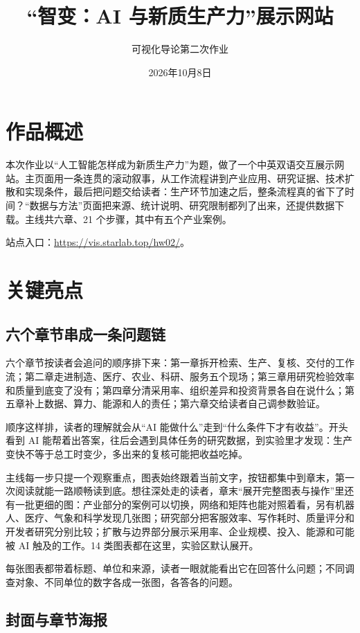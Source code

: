 \documentclass[UTF8,a4paper,11pt,fontset=fandol]{ctexart}
\title{“智变：AI 与新质生产力”展示网站}
\author{可视化导论第二次作业}
\date{2026年10月8日}
\begin{document}
\maketitle

\section{作品概述}

本次作业以“人工智能怎样成为新质生产力”为题，做了一个中英双语交互展示网站。主页面用一条连贯的滚动叙事，从工作流程讲到产业应用、研究证据、技术扩散和实现条件，最后把问题交给读者：生产环节加速之后，整条流程真的省下了时间？“数据与方法”页面把来源、统计说明、研究限制都列了出来，还提供数据下载。主线共六章、21 个步骤，其中有五个产业案例。

站点入口：\url{https://vis.starlab.top/hw02/}。

\section{关键亮点}

\subsection{六个章节串成一条问题链}

六个章节按读者会追问的顺序排下来：第一章拆开检索、生产、复核、交付的工作流；第二章走进制造、医疗、农业、科研、服务五个现场；第三章用研究检验效率和质量到底变了没有；第四章分清采用率、组织差异和投资背景各自在说什么；第五章补上数据、算力、能源和人的责任；第六章交给读者自己调参数验证。

顺序这样排，读者的理解就会从“AI 能做什么”走到“什么条件下才有收益”。开头看到 AI 能帮着出答案，往后会遇到具体任务的研究数据，到实验里才发现：生产变快不等于总工时变少，多出来的复核可能把收益吃掉。

主线每一步只提一个观察重点，图表始终跟着当前文字，按钮都集中到章末，第一次阅读就能一路顺畅读到底。想往深处走的读者，章末“展开完整图表与操作”里还有一批更细的图：产业部分的案例可以切换，网络和矩阵也能对照着看，另有机器人、医疗、气象和科学发现几张图；研究部分把客服效率、写作耗时、质量评分和开发者研究分别比较；扩散与边界部分展示采用率、企业规模、投入、能源和可能被 AI 触及的工作。14 类图表都在这里，实验区默认展开。

每张图表都带着标题、单位和来源，读者一眼就能看出它在回答什么问题；不同调查对象、不同单位的数字各成一张图，各答各的问题。

\subsection{封面与章节海报}
\end{document}
